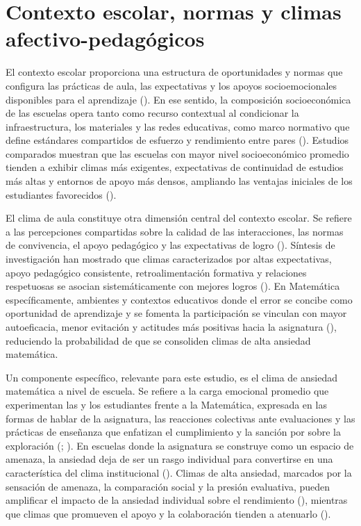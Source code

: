 \documentclass[
  spanish,
  a4paper,
  oneside]{scrbook}
\begin{document}
\section{Contexto escolar, normas y climas
afectivo-pedagógicos}\label{contexto-escolar-normas-y-climas-afectivo-pedaguxf3gicos}

El contexto escolar proporciona una estructura de oportunidades y normas
que configura las prácticas de aula, las expectativas y los apoyos
socioemocionales disponibles para el aprendizaje
(). En ese sentido, la
composición socioeconómica de las escuelas opera tanto como recurso
contextual al condicionar la infraestructura, los materiales y las redes
educativas, como marco normativo que define estándares compartidos de
esfuerzo y rendimiento entre pares
(). Estudios
comparados muestran que las escuelas con mayor nivel socioeconómico
promedio tienden a exhibir climas más exigentes, expectativas de
continuidad de estudios más altas y entornos de apoyo más densos,
ampliando las ventajas iniciales de los estudiantes favorecidos
().

El clima de aula constituye otra dimensión central del contexto escolar.
Se refiere a las percepciones compartidas sobre la calidad de las
interacciones, las normas de convivencia, el apoyo pedagógico y las
expectativas de logro (). Síntesis de
investigación han mostrado que climas caracterizados por altas
expectativas, apoyo pedagógico consistente, retroalimentación formativa
y relaciones respetuosas se asocian sistemáticamente con mejores logros
(). En Matemática
específicamente, ambientes y contextos educativos donde el error se
concibe como oportunidad de aprendizaje y se fomenta la participación se
vinculan con mayor autoeficacia, menor evitación y actitudes más
positivas hacia la asignatura (),
reduciendo la probabilidad de que se consoliden climas de alta ansiedad
matemática.

Un componente específico, relevante para este estudio, es el clima de
ansiedad matemática a nivel de escuela. Se refiere a la carga emocional
promedio que experimentan las y los estudiantes frente a la Matemática,
expresada en las formas de hablar de la asignatura, las reacciones
colectivas ante evaluaciones y las prácticas de enseñanza que enfatizan
el cumplimiento y la sanción por sobre la exploración
(;
). En escuelas donde la
asignatura se construye como un espacio de amenaza, la ansiedad deja de
ser un rasgo individual para convertirse en una característica del clima
institucional ().
Climas de alta ansiedad, marcados por la sensación de amenaza, la
comparación social y la presión evaluativa, pueden amplificar el impacto
de la ansiedad individual sobre el rendimiento
(), mientras
que climas que promueven el apoyo y la colaboración tienden a atenuarlo
().
\end{document}
